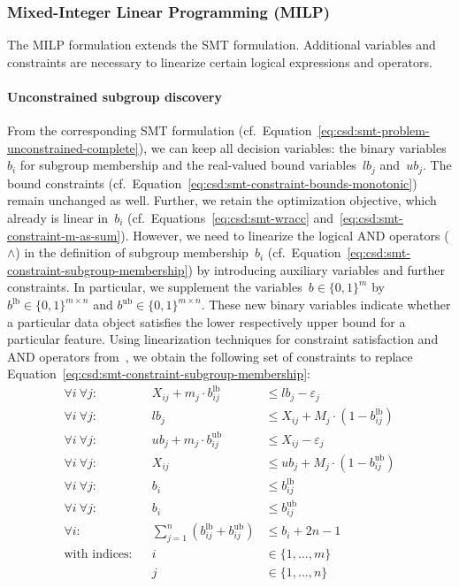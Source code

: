 \documentclass{article}
\theoremstyle{definition}
\begin{document}
\subsubsection{Mixed-Integer Linear Programming (MILP)}
\label{sec:csd:appendix:further-encodings:milp}

The MILP formulation extends the SMT formulation.
Additional variables and constraints are necessary to linearize certain logical expressions and operators.

\paragraph{Unconstrained subgroup discovery}

From the corresponding SMT formulation (cf.~Equation~\ref{eq:csd:smt-problem-unconstrained-complete}), we can keep all decision variables:
the binary variables~$b_i$ for subgroup membership and the real-valued bound variables~$\mathit{lb}_j$ and~$\mathit{ub}_j$.
The bound constraints (cf.~Equation~\ref{eq:csd:smt-constraint-bounds-monotonic}) remain unchanged as well.
Further, we retain the optimization objective, which already is linear in~$b_i$ (cf.~Equations~\ref{eq:csd:smt-wracc} and~\ref{eq:csd:smt-constraint-m-as-sum}).
However, we need to linearize the logical AND operators ($\land$) in the definition of subgroup membership~$b_i$ (cf.~Equation~\ref{eq:csd:smt-constraint-subgroup-membership}) by introducing auxiliary variables and further constraints.
In particular, we supplement the variables~$b \in \{0, 1\}^m$ by $b^{\text{lb}} \in \{0, 1\}^{m \times n}$ and $b^{\text{ub}} \in \{0, 1\}^{m \times n}$.
These new binary variables indicate whether a particular data object satisfies the lower respectively upper bound for a particular feature.
Using linearization techniques for constraint satisfaction and AND operators from~\cite{mosek2022modeling}, we obtain the following set of constraints to replace Equation~\ref{eq:csd:smt-constraint-subgroup-membership}:
%
\begin{equation}
	\begin{aligned}
		\forall i~\forall j: & & X_{ij} + m_j \cdot b^{\text{lb}}_{ij} &\leq \mathit{lb}_j - \varepsilon_j \\
	 	\forall i~\forall j: & & \mathit{lb}_j &\leq X_{ij} + M_j \cdot \left(1 - b^{\text{lb}}_{ij} \right) \\
	 	\forall i~\forall j: & & \mathit{ub}_j + m_j \cdot b^{\text{ub}}_{ij} &\leq X_{ij} - \varepsilon_j \\
	 	\forall i~\forall j: & & X_{ij} &\leq \mathit{ub}_j + M_j \cdot \left(1 - b^{\text{ub}}_{ij} \right) \\
	 	\forall i~\forall j: & & b_i &\leq b^{\text{lb}}_{ij} \\
	 	\forall i~\forall j: & & b_i &\leq b^{\text{ub}}_{ij} \\
	 	\forall i: & & \sum_{j=1}^{n} \left( b^{\text{lb}}_{ij} + b^{\text{ub}}_{ij} \right) &\leq b_i + 2n - 1 \\
		\text{with indices:} & & i &\in \{1, \dots, m\} \\
		& & j &\in \{1, \dots, n\}
	\end{aligned}
	\label{eq:csd:milp-constraint-subgroup-membership}
\end{equation}
\end{document}
